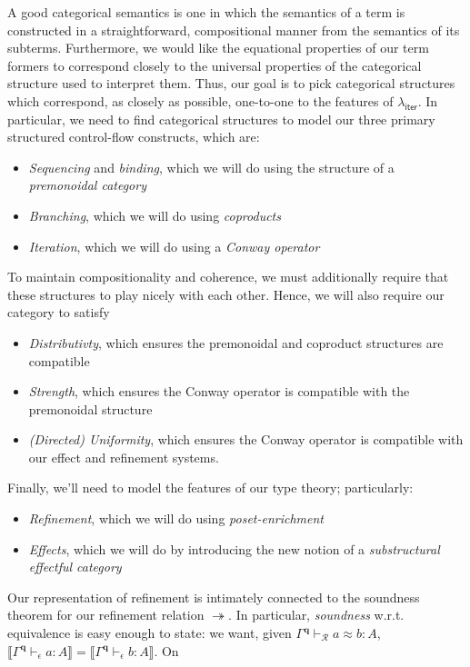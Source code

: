 \documentclass[acmsmall,screen,review]{acmart}
\newcommand{\mc}[1]{\ensuremath{\mathcal{#1}}}
\newcommand{\mb}[1]{\ensuremath{\mathbf{#1}}}
\newcommand{\ms}[1]{\ensuremath{\mathsf{#1}}}
\newcommand{\hasty}[4]{#1 \vdash_{#2} #3: {#4}}
\newcommand{\teqv}{\approx}
\newcommand{\tref}{\twoheadrightarrow}
\newcommand{\tmeq}[5]{#1 \vdash_{#2} #3 \teqv #4 : {#5}}
\newcommand{\dnt}[1]{\llbracket{#1}\rrbracket}
\newcommand{\subiterexp}{\(\lambda_{\ms{iter}}\)}
\begin{document}
A good categorical semantics is one in which the semantics of a term is constructed in a
straightforward, compositional manner from the semantics of its subterms. Furthermore, we would like
the equational properties of our term formers to correspond closely to the universal properties of
the categorical structure used to interpret them. Thus, our goal is to pick categorical structures
which correspond, as closely as possible, one-to-one to the features of \subiterexp{}. In
particular, we need to find categorical structures to model our three primary structured
control-flow constructs, which are:
\begin{itemize}
  \item \emph{Sequencing} and \emph{binding}, which we will do using the structure of a
  \emph{premonoidal category}
  \item \emph{Branching}, which we will do using \emph{coproducts}
  \item \emph{Iteration}, which we will do using a \emph{Conway operator}
\end{itemize}
To maintain compositionality and coherence, we must additionally require that these structures to
play nicely with each other. Hence, we will also require our category to satisfy
\begin{itemize}
  \item \emph{Distributivty}, which ensures the premonoidal and coproduct structures are compatible
  \item \emph{Strength}, which ensures the Conway operator is compatible with the premonoidal
  structure
  \item \emph{(Directed) Uniformity}, which ensures the Conway operator is compatible with our
  effect and refinement systems.
\end{itemize}
Finally, we'll need to model the features of our type theory; particularly:
\begin{itemize}
  \item \emph{Refinement}, which we will do using \emph{poset-enrichment}
  \item \emph{Effects}, which we will do by introducing the new notion of a \emph{substructural
  effectful category}
\end{itemize}
Our representation of refinement is intimately connected to the soundness theorem for our refinement
relation $\tref$. In particular, \emph{soundness} w.r.t. equivalence is easy enough to state: we
want, given $\tmeq{\Gamma^{\mb{q}}}{\mc{R}}{a}{b}{A}$,
$\dnt{\hasty{\Gamma^{\mb{q}}}{\epsilon}{a}{A}} = \dnt{\hasty{\Gamma^{\mb{q}}}{\epsilon}{b}{A}}$. On
\end{document}
